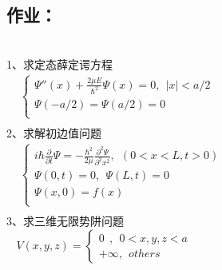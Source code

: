 \subsection{作业：}
~~~\hspace*{\fill} \\
1、求定态薛定谔方程\\ 
$\begin{array}{lllllllll}
	& \begin{cases}
		\Psi'' (x) +\frac{2\mu E}{\hbar ^2} \Psi(x) =0,~~ |x|<a/2 \\
		\Psi(-a/2) =\Psi(a/2) =0\\
	\end{cases}\\	
\end{array}$ \\ 
2、求解初边值问题\\
$\begin{array}{lllllllll}
	& \begin{cases}
		i\hbar \frac{\partial }{\partial t} \Psi = -\frac{\hbar^2}{2\mu } \frac{\partial ^2 \Psi }{\partial ^2  x ^2 } , ~~ (0<x<L, t>0) \\
		\Psi (0,t) =0, ~~ \Psi (L,t) =0 \\
		\Psi (x,0) =f(x)  \\
	\end{cases}\\
\end{array}$ \\ 
3、求三维无限势阱问题\\
$ ~~~~	V(x,y,z)=\left \{ 
\begin{array}{cccc}
	0	~~ ,~~ 0<x,y,z<a \\  
	+\infty ,~~others\
\end{array}
\right.
 $ 